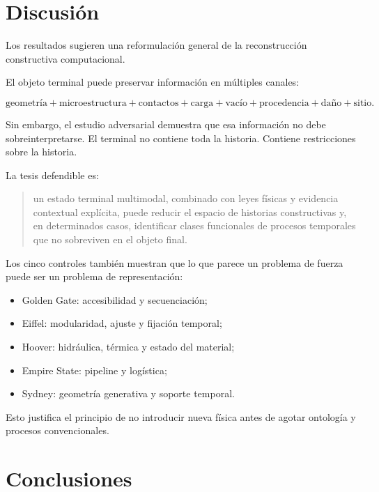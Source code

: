 
\section{Discusión}

Los resultados sugieren una reformulación general de la reconstrucción constructiva computacional.

El objeto terminal puede preservar información en múltiples canales:

\begin{equation}
\boxed{
\text{geometría}
+
\text{microestructura}
+
\text{contactos}
+
\text{carga}
+
\text{vacío}
+
\text{procedencia}
+
\text{daño}
+
\text{sitio}.
}
\end{equation}

Sin embargo, el estudio adversarial demuestra que esa información no debe sobreinterpretarse. El terminal no contiene toda la historia. Contiene restricciones sobre la historia.

La tesis defendible es:

\begin{quote}
un estado terminal multimodal, combinado con leyes físicas y evidencia contextual explícita, puede reducir el espacio de historias constructivas y, en determinados casos, identificar clases funcionales de procesos temporales que no sobreviven en el objeto final.
\end{quote}

Los cinco controles también muestran que lo que parece un problema de fuerza puede ser un problema de representación:

\begin{itemize}
\item Golden Gate: accesibilidad y secuenciación;
\item Eiffel: modularidad, ajuste y fijación temporal;
\item Hoover: hidráulica, térmica y estado del material;
\item Empire State: pipeline y logística;
\item Sydney: geometría generativa y soporte temporal.
\end{itemize}

Esto justifica el principio de no introducir nueva física antes de agotar ontología y procesos convencionales.

\section{Conclusiones}

